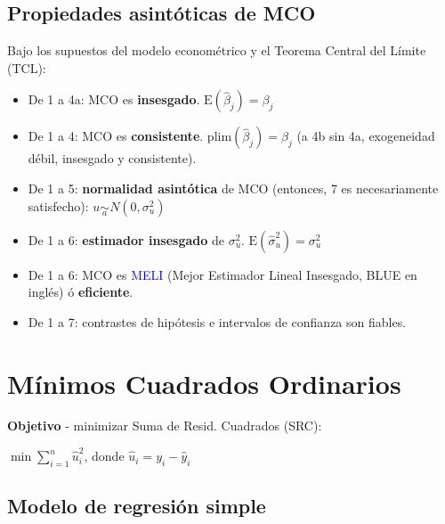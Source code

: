 \documentclass[10pt, a4paper, landscape]{extarticle}
\newcommand{\E}{\mathrm{E}}
\begin{document}
\begin{multicols}{3}
\subsection*{Propiedades asintóticas de MCO}

Bajo los supuestos del modelo econométrico y el Teorema Central del Límite (TCL):

\begin{itemize}[leftmargin=*]
	\item De 1 a 4a: MCO es \textbf{insesgado}. $\E(\hat{\beta}_j) = \beta_j$
	\item De 1 a 4: MCO es \textbf{consistente}. $\mathrm{plim}(\hat{\beta}_j) = \beta_j$ (a 4b sin 4a, exogeneidad débil, insesgado y consistente).
	\item De 1 a 5: \textbf{normalidad asintótica} de MCO (entonces, 7 es necesariamente satisfecho): $u \underset{a}{\sim} N(0, \sigma^2_u)$
	\item De 1 a 6: \textbf{estimador insesgado} de $\sigma^2_u$. $\E(\hat{\sigma}^2_u) = \sigma^2_u$
	\item De 1 a 6: MCO es \textcolor{blue}{MELI} (Mejor Estimador Lineal Insesgado, BLUE en inglés) ó \textbf{eficiente}. 
	\item De 1 a 7: contrastes de hipótesis e intervalos de confianza son fiables.
\end{itemize}

\section*{Mínimos Cuadrados Ordinarios}

\textbf{Objetivo} - minimizar Suma de Resid. Cuadrados (SRC):

\begin{center}
	$\min \sum_{i=1}^n \hat{u}_i^2$, donde $\hat{u}_i = y_i - \hat{y}_i$
\end{center}

\subsection*{Modelo de regresión simple}

\setlength{\multicolsep}{2pt}
\setlength{\columnsep}{-40pt}
\begin{multicols}{2}



\end{multicols}
\end{multicols}
\end{document}
